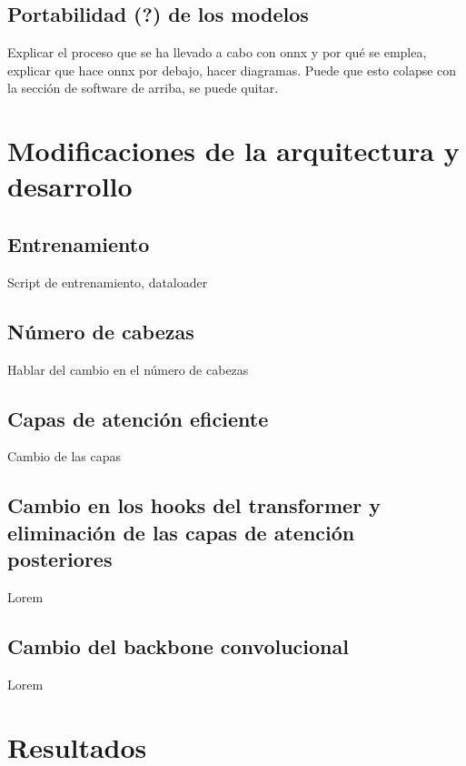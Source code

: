 \documentclass[a4paper]{article}
\begin{document}






\subsection{Portabilidad (?) de los modelos}
Explicar el proceso que se ha llevado a cabo con onnx y por qué se emplea, explicar que hace onnx por debajo, hacer diagramas. Puede que esto colapse con la sección de software de arriba, se puede quitar.


\clearpage
\section{Modificaciones de la arquitectura y desarrollo}
\subsection{Entrenamiento}
Script de entrenamiento, dataloader
\subsection{Número de cabezas}
Hablar del cambio en el número de cabezas
\subsection{Capas de atención eficiente}
Cambio de las capas
\subsection{Cambio en los hooks del transformer y eliminación de las capas de atención posteriores}
Lorem
\subsection{Cambio del backbone convolucional}
Lorem



\clearpage
\section{Resultados}
\end{document}
